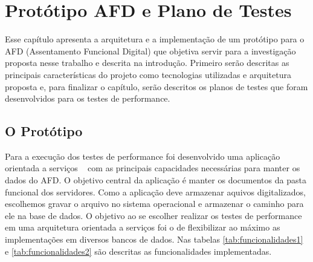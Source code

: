 \chapter{Protótipo AFD e Plano de Testes}

Esse capítulo apresenta a arquitetura e a implementação de um protótipo para o AFD (Assentamento Funcional Digital) que objetiva servir para a investigação proposta nesse trabalho e descrita na introdução. Primeiro serão descritas as principais características do projeto como tecnologias utilizadas e arquitetura proposta e,  para finalizar o capítulo, serão descritos os planos de testes que foram desenvolvidos para os testes de performance.

\section{O Protótipo}

Para a execução dos testes de performance foi desenvolvido uma aplicação orientada a serviços ~\cite{erl:2007} com as principais capacidades necessárias para manter os dados do AFD. O objetivo central da aplicação é manter os documentos da pasta funcional dos servidores. Como a aplicação deve armazenar aquivos digitalizados, escolhemos gravar o arquivo no sistema operacional e armazenar o caminho para ele na base de dados. O objetivo ao se escolher realizar os testes de performance em uma arquitetura orientada a serviços foi o de flexibilizar ao máximo as implementações em diversos bancos de dados. Nas tabelas \ref{tab:funcionalidades1} e \ref{tab:funcionalidades2} são descritas as funcionalidades implementadas.

\renewcommand{\arraystretch}{3}

